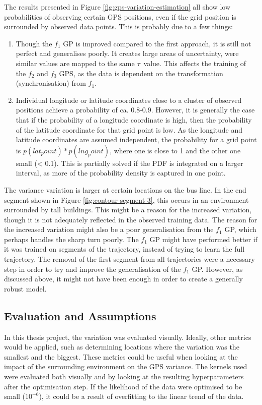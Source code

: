 The results presented in Figure \ref{fig:gps-variation-estimation} all show low probabilities of observing certain GPS positions, even if the grid position is surrounded by observed data points.
This is probably due to a few things:
    \begin{enumerate}
        \item Though the $f_1$ GP is improved compared to the first approach, it is still not perfect and generalises poorly.
        It creates large areas of uncertainty, were similar values are mapped to the same $\tau$ value.
        This affects the training of the $f_2$ and $f_3$ GPS, as the data is dependent on the transformation (synchronisation) from $f_1$.
        \item Individual longitude or latitude coordinates close to a cluster of observed positions achieve a probability of ca. 0.8-0.9.
        However, it is generally the case that if the probability of a longitude coordinate is high, then the probability of the latitude coordinate for that grid point is low.
        As the longitude and latitude coordinates are assumed independent, the probability for a grid point is $p(lat_point) * p(lng_point)$, where one is close to 1 and the other one small (< 0.1).
        This is partially solved if the PDF is integrated on a larger interval, as more of the probability density is captured in one point.
    \end{enumerate}

The variance variation is larger at certain locations on the bus line.
In the end segment shown in Figure \ref{fig:contour-segment-3}, this occurs in an environment surrounded by tall buildings.
This might be a reason for the increased variation, though it is not adequately reflected in the observed training data.
The reason for the increased variation might also be a poor generalisation from the $f_1$ GP, which perhaps handles the sharp turn poorly.
The $f_1$ GP might have performed better if it was trained on segments of the trajectory, instead of trying to learn the full trajectory.
The removal of the first segment from all trajectories were a necessary step in order to try and improve the generalisation of the $f_1$ GP.
However, as discussed above, it might not have been enough in order to create a generally robust model.

\subsection{Evaluation and Assumptions}
In this thesis project, the variation was evaluated visually.
Ideally, other metrics would be applied, such as determining locations where the variation was the smallest and the biggest.
These metrics could be useful when looking at the impact of the surrounding environment on the GPS variance.
The kernels used were evaluated both visually and by looking at the resulting hyperparameters after the optimisation step.
If the likelihood of the data were optimised to be small ($10^{-6}$), it could be a result of overfitting to the linear trend of the data.

